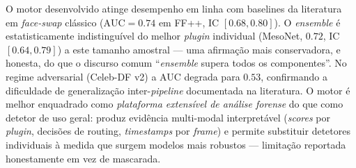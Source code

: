 O motor desenvolvido atinge desempenho em linha com baselines da literatura
em \emph{face-swap} clássico ($\mathrm{AUC}=0.74$ em FF++, IC $[0.68, 0.80]$).
O \emph{ensemble} é estatisticamente indistinguível do melhor \emph{plugin}
individual (MesoNet, $0.72$, IC $[0.64, 0.79]$) a este tamanho amostral ---
uma afirmação mais conservadora, e honesta, do que o discurso comum
``\emph{ensemble} supera todos os componentes''. No regime adversarial
(Celeb-DF v2) a AUC degrada para $0.53$, confirmando a dificuldade de
generalização inter-\emph{pipeline} documentada na literatura. O motor é melhor enquadrado como
\emph{plataforma extensível de análise forense} do que como detetor de uso
geral: produz evidência multi-modal interpretável (\emph{scores} por
\emph{plugin}, decisões de routing, \emph{timestamps} por \emph{frame}) e
permite substituir detetores individuais à medida que surgem modelos mais
robustos --- limitação reportada honestamente em vez de mascarada.
